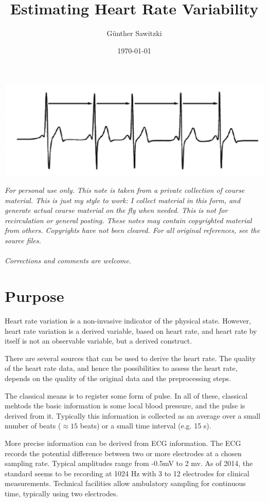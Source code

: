 \documentclass[a4paper, english, utf8]{amsart}
\title{Estimating Heart Rate Variability}
\author[G. Sawitzki]{G\"unther Sawitzki}
\date{\today}
\begin{document}
\maketitle
{\centering
\includegraphics[width=0.6\linewidth]{../media/hrv1}

}
{
\parskip 0pt

\tableofcontents
}
\bigskip
\emph{For personal use only. 
This note is taken from a private collection of course material. 
This is just my style to work:  
I collect material in this form, and generate actual course material on the fly when needed. 
This is not for recirculation or general posting. 
These notes may contain copyrighted material from others. 
Copyrights have not been cleared. For all original references, see the source files.\\
\ \\
Corrections and comments are welcome.}


\section{Purpose}
Heart rate variation is a non-invasive indicator of the physical state.
However, heart rate variation is a derived variable, based on heart
rate, and heart rate by itself is not an observable variable, but a
derived construct.

There are several sources that can be used to derive the heart rate. The
quality of the heart rate data, and hence the possibilities to 
assess the heart rate, depends on the quality of the original data and
the preprocessing steps.

The classical means is to register some form of pulse. In all of these,
classical mehtods the basic information is some local blood pressure, and the pulse
is derived from it. Typically this information is collected as an average
over a small number of beats ($\approx 15$ beats) or a small time interval (e.g. 15 s).

More precise information can be derived from ECG information. The ECG
records the potential difference between two or more electrodes at a
chosen sampling rate. Typical amplitudes range from -0.5mV to 2 mv. As
of 2014, the standard seems to be recording at 1024 Hz with 3 to 12 electrodes for 
clinical measurements. Technical
facilities allow ambulatory sampling for continuous time, typically using two electrodes.
\end{document}

